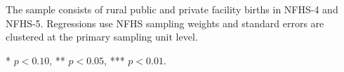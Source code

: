 \documentclass[12pt]{article}
\begin{document}
\begin{landscape}
\begin{table}[H]
\begin{threeparttable}
\begin{minipage}{0.92\textwidth}
            The sample consists of rural public and private facility births
            in NFHS-4 and NFHS-5. Regressions use NFHS sampling weights and
            standard errors are clustered at the primary sampling unit level.

            * $p<0.10$, ** $p<0.05$, *** $p<0.01$.
        \end{minipage}

    \end{threeparttable}

\end{table}

\setlength{\tabcolsep}{6pt}
\renewcommand{\arraystretch}{1}

\end{landscape}
\end{document}
